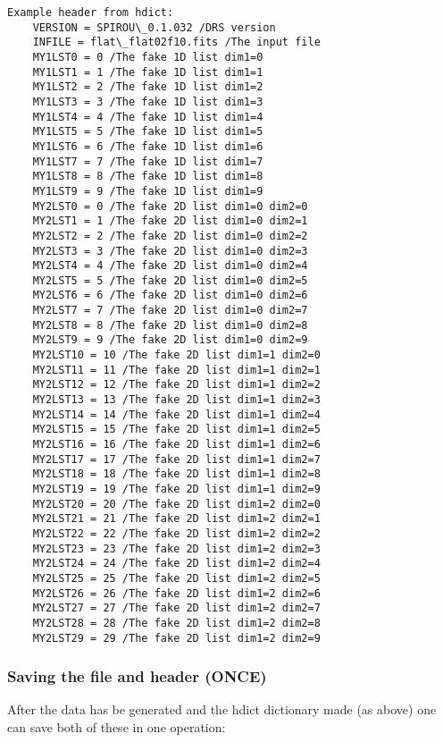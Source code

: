 \documentclass[11pt]{article}
\begin{document}
    \begin{Verbatim}[commandchars=\\\{\}]
Example header from hdict: 
	VERSION = SPIROU\_0.1.032 /DRS version
	INFILE = flat\_flat02f10.fits /The input file
	MY1LST0 = 0 /The fake 1D list dim1=0
	MY1LST1 = 1 /The fake 1D list dim1=1
	MY1LST2 = 2 /The fake 1D list dim1=2
	MY1LST3 = 3 /The fake 1D list dim1=3
	MY1LST4 = 4 /The fake 1D list dim1=4
	MY1LST5 = 5 /The fake 1D list dim1=5
	MY1LST6 = 6 /The fake 1D list dim1=6
	MY1LST7 = 7 /The fake 1D list dim1=7
	MY1LST8 = 8 /The fake 1D list dim1=8
	MY1LST9 = 9 /The fake 1D list dim1=9
	MY2LST0 = 0 /The fake 2D list dim1=0 dim2=0
	MY2LST1 = 1 /The fake 2D list dim1=0 dim2=1
	MY2LST2 = 2 /The fake 2D list dim1=0 dim2=2
	MY2LST3 = 3 /The fake 2D list dim1=0 dim2=3
	MY2LST4 = 4 /The fake 2D list dim1=0 dim2=4
	MY2LST5 = 5 /The fake 2D list dim1=0 dim2=5
	MY2LST6 = 6 /The fake 2D list dim1=0 dim2=6
	MY2LST7 = 7 /The fake 2D list dim1=0 dim2=7
	MY2LST8 = 8 /The fake 2D list dim1=0 dim2=8
	MY2LST9 = 9 /The fake 2D list dim1=0 dim2=9
	MY2LST10 = 10 /The fake 2D list dim1=1 dim2=0
	MY2LST11 = 11 /The fake 2D list dim1=1 dim2=1
	MY2LST12 = 12 /The fake 2D list dim1=1 dim2=2
	MY2LST13 = 13 /The fake 2D list dim1=1 dim2=3
	MY2LST14 = 14 /The fake 2D list dim1=1 dim2=4
	MY2LST15 = 15 /The fake 2D list dim1=1 dim2=5
	MY2LST16 = 16 /The fake 2D list dim1=1 dim2=6
	MY2LST17 = 17 /The fake 2D list dim1=1 dim2=7
	MY2LST18 = 18 /The fake 2D list dim1=1 dim2=8
	MY2LST19 = 19 /The fake 2D list dim1=1 dim2=9
	MY2LST20 = 20 /The fake 2D list dim1=2 dim2=0
	MY2LST21 = 21 /The fake 2D list dim1=2 dim2=1
	MY2LST22 = 22 /The fake 2D list dim1=2 dim2=2
	MY2LST23 = 23 /The fake 2D list dim1=2 dim2=3
	MY2LST24 = 24 /The fake 2D list dim1=2 dim2=4
	MY2LST25 = 25 /The fake 2D list dim1=2 dim2=5
	MY2LST26 = 26 /The fake 2D list dim1=2 dim2=6
	MY2LST27 = 27 /The fake 2D list dim1=2 dim2=7
	MY2LST28 = 28 /The fake 2D list dim1=2 dim2=8
	MY2LST29 = 29 /The fake 2D list dim1=2 dim2=9

    \end{Verbatim}

    \subsubsection{\texorpdfstring{Saving the file and header
(\textbf{ONCE})}{Saving the file and header (ONCE)}}\label{saving-the-file-and-header-once}

After the data has be generated and the hdict dictionary made (as above)
one can save both of these in one operation:
\end{document}
